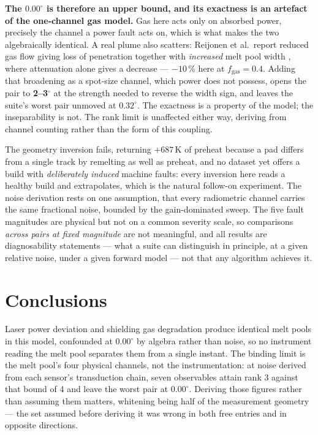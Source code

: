 \documentclass[preprint,times]{elsarticle}
\begin{document}
\textbf{The $0.00^\circ$ is therefore an upper bound, and its exactness is an
artefact of the one-channel gas model.} Gas here acts only on absorbed power,
precisely the channel a power fault acts on, which is what makes the two
algebraically identical. A real plume also scatters: Reijonen et al.\ report
reduced gas flow giving loss of penetration together with \emph{increased} melt
pool width \cite{Reijonen2020}, where attenuation alone gives a decrease ---
$-10$\,\% here at $f_{\mathrm{gas}}=0.4$. Adding that broadening as a spot-size
channel, which power does not possess, opens the pair to \textbf{2--3$^\circ$}
at the strength needed to reverse the width sign, and leaves the suite's worst
pair unmoved at $0.32^\circ$. The exactness is a property of the model; the
inseparability is not. The rank limit is unaffected either way, deriving from
channel counting rather than the form of this coupling.

The geometry inversion fails, returning $+687$\,K of preheat because a pad
differs from a single track by remelting as well as preheat, and no dataset yet
offers a build with \emph{deliberately induced} machine faults: every inversion
here reads a healthy build and extrapolates, which is the natural follow-on
experiment. The noise derivation rests on one assumption, that every radiometric
channel carries the same fractional noise, bounded by the gain-dominated sweep.
The five fault magnitudes are physical but not on a common severity scale, so
comparisons \emph{across pairs at fixed magnitude} are not meaningful, and all
results are diagnosability statements --- what a suite can distinguish in
principle, at a given relative noise, under a given forward model --- not that
any algorithm achieves it.

\section{Conclusions}

Laser power deviation and shielding gas degradation produce identical melt pools
in this model, confounded at $0.00^\circ$ by algebra rather than noise, so no
instrument reading the melt pool separates them from a single instant. The
binding limit is the melt pool's four physical channels, not the instrumentation:
at noise derived from each sensor's transduction chain, seven observables attain
rank 3 against that bound of 4 and leave the worst pair at $0.00^\circ$. Deriving
those figures rather than assuming them matters, whitening being half of the
measurement geometry --- the set assumed before deriving it was wrong in both
free entries and in opposite directions.
\end{document}
